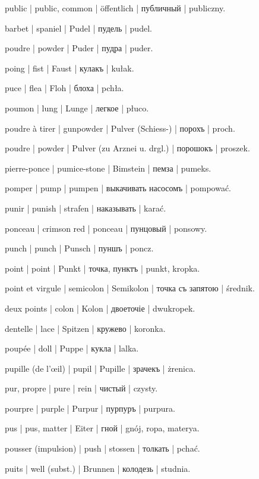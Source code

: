 \begin{outdent}{1em}
\uvsubentry{}
public | public, common | öffentlich | публичный | publiczny.

barbet | spaniel | Pudel | пудель | pudel.

poudre | powder | Puder | пудра | puder.

poing | fist | Faust | кулакъ | kułak.

puce | flea | Floh | блоха | pchła.

poumon | lung | Lunge | легкое | płuco.

poudre à tirer | gunpowder | Pulver (Schiess-) | порохъ | proch.

poudre | powder | Pulver (zu Arznei u. drgl.) | порошокъ | proszek.

pierre-ponce | pumice-stone | Bimstein | пемза | pumeks.

pomper | pump | pumpen | выкачивать насосомъ | pompować.

punir | punish | strafen | наказывать | karać.

ponceau | crimson red | ponceau | пунцовый | ponsowy.

punch | punch | Punsch | пуншъ | poncz.

point | point | Punkt | точка, пунктъ | punkt, kropka.

\uvsubentry{}
point et virgule | semicolon | Semikolon | точка съ запятою | średnik.


\uvsubentry{}
deux points | colon | Kolon | двоеточіе | dwukropek.

dentelle | lace | Spitzen | кружево | koronka.

poupée | doll | Puppe | кукла | lalka.

pupille (de l’œil) | pupil | Pupille | зрачекъ | żrenica.

pur, propre | pure | rein | чистый | czysty.

pourpre | purple | Purpur | пурпуръ | purpura.

pus | pus, matter | Eiter | гной | gnój, ropa, materya.

pousser (impulsion) | push | stossen | толкать | pchać.

puits | well (subst.) | Brunnen | колодезь | studnia.


\end{outdent}
